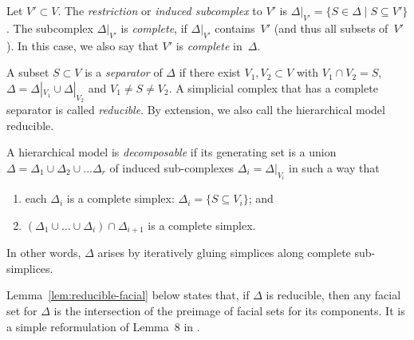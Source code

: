 \documentclass[aos,noinfoline]{imsart}
\theoremstyle{remark}
\theoremstyle{definition}
\begin{document}
Let $V'\subset V$.  The \emph{restriction} or \emph{induced subcomplex} to $V'$ is
$\Delta|_{V'}=\{ S\in\Delta\mid S\subseteq V'\}$.  The subcomplex $\Delta|_{V'}$ is \emph{complete}, if $\Delta|_{V'}$
contains~$V'$ (and thus all subsets of~$V'$).  In this case, we also say that $V'$ is \emph{complete} in~$\Delta$.

A subset $S\subset V$ is a \emph{separator} of $\Delta$ if there exist $V_{1},V_{2}\subset V$ with $V_{1}\cap V_{2}=S$,
$\Delta=\Delta|_{V_{1}}\cup\Delta|_{V_{2}}$ and $V_{1}\neq S\neq V_{2}$.
A simplicial complex that has a complete separator is called \emph{reducible}. By extension, we also call the
hierarchical model reducible.

A hierarchical model is \emph{decomposable} if its generating set is a union
$\Delta=\Delta_{1}\cup\Delta_{2}\cup\dots\Delta_{r}$ of induced sub-complexes $\Delta_{i}=\Delta|_{V_{i}}$ in such a way
that
\begin{enumerate}
\item each $\Delta_{i}$ is a complete simplex: $\Delta_i = \{ S \subseteq V_{i}\}$; and
\item $(\Delta_{1}\cup\dots\cup\Delta_{i})\cap\Delta_{i+1}$ is a complete simplex.
\end{enumerate}
In other words, $\Delta$ arises by iteratively gluing simplices along complete sub-simplices.

Lemma~\ref{lem:reducible-facial} below states that, if $\Delta$ is reducible, then any facial set for $\Delta$ is the
intersection of the preimage of facial sets for its components.  It is a simple reformulation of Lemma~8 in
\citep{EFRS06:Polyhedral_conditions_MLE}.
\end{document}
